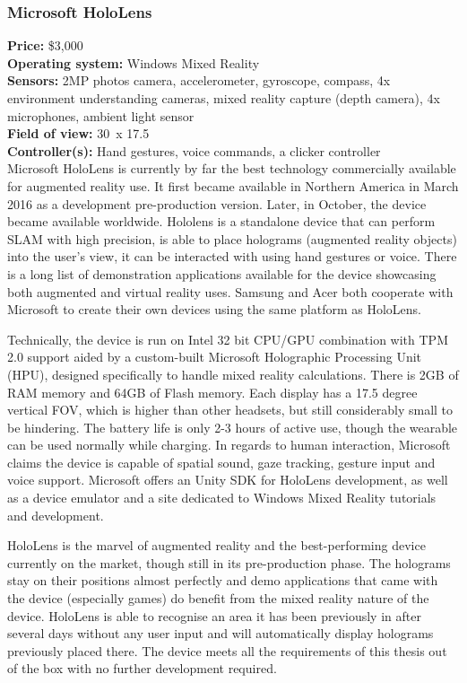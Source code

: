 \documentclass[12pt, a4paper]{article}
\begin{document}
\subsubsection{Microsoft HoloLens}
\vspace*{-5mm}
\textbf{Price:} \$3,000\\
\textbf{Operating system:} Windows Mixed Reality\\
\textbf{Sensors:} 2MP photos camera, accelerometer, gyroscope, compass, 4x environment understanding cameras, mixed reality capture (depth camera), 4x microphones, ambient light sensor\\
\textbf{Field of view:}  30\degree~x 17.5\degree\\
\textbf{Controller(s):} Hand gestures, voice commands, a clicker controller \bigskip \\
Microsoft HoloLens is currently by far the best technology commercially available for augmented reality use. It first became available in Northern America in March 2016 as a development pre-production version. Later, in October, the device became available worldwide. Hololens is a standalone device that can perform SLAM with high precision, is able to place holograms (augmented reality objects) into the user’s view, it can be interacted with using hand gestures or voice. There is a long list of demonstration applications available for the device showcasing both augmented and virtual reality uses. Samsung and Acer both cooperate with Microsoft to create their own devices using the same platform as HoloLens.

Technically, the device is run on Intel 32 bit CPU/GPU combination with TPM 2.0 support aided by a custom-built Microsoft Holographic Processing Unit (HPU), designed specifically to handle mixed reality calculations. There is 2GB of RAM memory and 64GB of Flash memory. Each display has a 17.5 degree vertical FOV, which is higher than other headsets, but still considerably small to be hindering. The battery life is only 2-3 hours of active use, though the wearable can be used normally while charging. In regards to human interaction, Microsoft claims the device is capable of spatial sound, gaze tracking, gesture input and voice support. Microsoft offers an Unity SDK for HoloLens development, as well as a device emulator and a site dedicated to Windows Mixed Reality tutorials and development.

HoloLens is the marvel of augmented reality and the best-performing device currently on the market, though still in its pre-production phase. The holograms stay on their positions almost perfectly and demo applications that came with the device (especially games) do benefit from the mixed reality nature of the device. HoloLens is able to recognise an area it has been previously in after several days without any user input and will automatically display holograms previously placed there. The device meets all the requirements of this thesis out of the box with no further development required.
\end{document}
